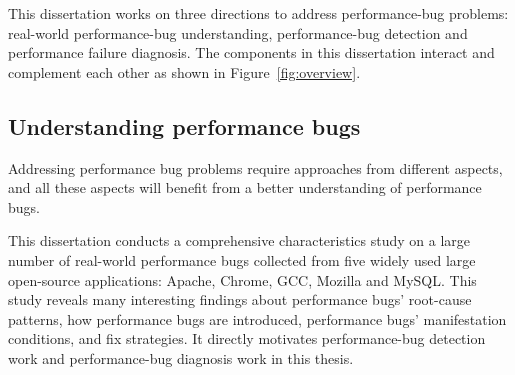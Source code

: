This dissertation works on three directions to address performance-bug problems:
real-world performance-bug understanding, 
performance-bug detection and performance failure diagnosis. 
The components in this dissertation interact and complement each other as shown in Figure~\ref{fig:overview}.


\subsection{Understanding performance bugs}

Addressing performance bug problems require approaches from different aspects, 
and all these aspects will benefit from a better understanding of performance bugs. 

This dissertation conducts a comprehensive characteristics study on 
a large number of real-world performance bugs collected from five widely used large open-source applications: 
Apache, Chrome, GCC, Mozilla and MySQL. 
This study reveals many interesting findings about performance bugs' root-cause patterns, 
how performance bugs are introduced, performance bugs' manifestation conditions, and fix strategies. 
It directly motivates performance-bug detection work and performance-bug diagnosis work in this thesis. 

